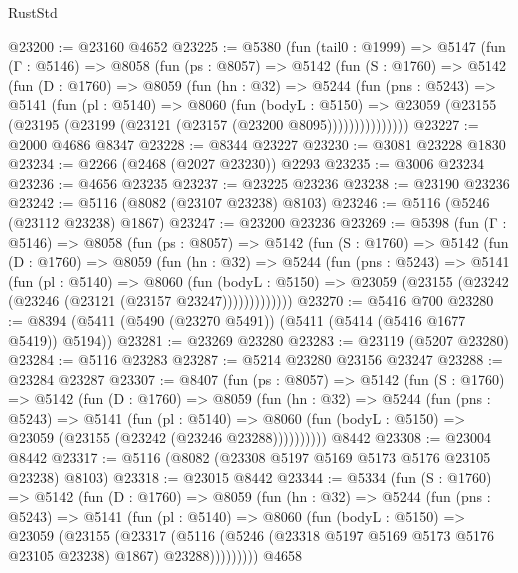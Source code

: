 \begin{lexlean}{RustStd}
\begin{coremodule}
{\begin{coremodule}
{{{{{{{{{{{{{{{{{{{{{{{{{{{{{{{@23200 := @23160 @4652
@23225 := @5380
    (fun (tail0 : @1999) =>
    @5147
      (fun (Γ : @5146) =>
      @8058
        (fun (ps : @8057) =>
        @5142
          (fun (S : @1760) =>
          @5142
            (fun (D : @1760) =>
            @8059
              (fun (hn : @32) =>
              @5244
                (fun (pns : @5243) =>
                @5141
                  (fun (pl : @5140) =>
                  @8060
                    (fun (bodyL : @5150) =>
                    @23059 (@23155 (@23195 (@23199 (@23121 (@23157 (@23200 @8095)))))))))))))))
@23227 := @2000 @4686 @8347
@23228 := @8344 @23227
@23230 := @3081 @23228 @1830
@23234 := @2266 (@2468 (@2027 @23230)) @2293
@23235 := @3006 @23234
@23236 := @4656 @23235
@23237 := @23225 @23236
@23238 := @23190 @23236
@23242 := @5116 (@8082 (@23107 @23238) @8103)
@23246 := @5116 (@5246 (@23112 @23238) @1867)
@23247 := @23200 @23236
@23269 := @5398
    (fun (Γ : @5146) =>
    @8058
      (fun (ps : @8057) =>
      @5142
        (fun (S : @1760) =>
        @5142
          (fun (D : @1760) =>
          @8059
            (fun (hn : @32) =>
            @5244
              (fun (pns : @5243) =>
              @5141
                (fun (pl : @5140) =>
                @8060
                  (fun (bodyL : @5150) =>
                  @23059 (@23155 (@23242 (@23246 (@23121 (@23157 @23247)))))))))))))
@23270 := @5416 @700
@23280 := @8394 (@5411 (@5490 (@23270 @5491)) (@5411 (@5414 (@5416 @1677 @5419)) @5194))
@23281 := @23269 @23280
@23283 := @23119 (@5207 @23280)
@23284 := @5116 @23283
@23287 := @5214 @23280 @23156 @23247
@23288 := @23284 @23287
@23307 := @8407
    (fun (ps : @8057) =>
    @5142
      (fun (S : @1760) =>
      @5142
        (fun (D : @1760) =>
        @8059
          (fun (hn : @32) =>
          @5244
            (fun (pns : @5243) =>
            @5141
              (fun (pl : @5140) =>
              @8060 (fun (bodyL : @5150) => @23059 (@23155 (@23242 (@23246 @23288))))))))))
    @8442
@23308 := @23004 @8442
@23317 := @5116 (@8082 (@23308 @5197 @5169 @5173 @5176 @23105 @23238) @8103)
@23318 := @23015 @8442
@23344 := @5334
    (fun (S : @1760) =>
    @5142
      (fun (D : @1760) =>
      @8059
        (fun (hn : @32) =>
        @5244
          (fun (pns : @5243) =>
          @5141
            (fun (pl : @5140) =>
            @8060
              (fun (bodyL : @5150) =>
              @23059
                (@23155
                  (@23317
                    (@5116
                      (@5246 (@23318 @5197 @5169 @5173 @5176 @23105 @23238) @1867)
                      @23288)))))))))
    @4658
}}}}}}}}}}}}}}}}}}}}}}}}}}}}}}}
\end{coremodule}}
\end{coremodule}
\end{lexlean}
